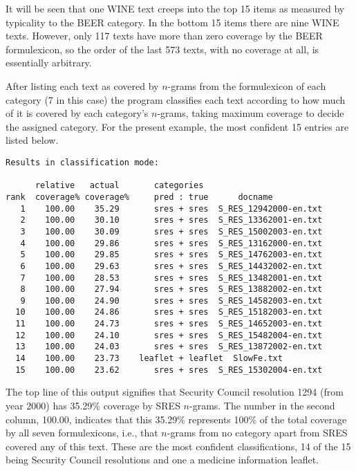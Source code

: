 \documentclass[output=paper]{langscibook}
\begin{document}
It will be seen that one WINE text creeps into the top 15 items as measured by typicality to the BEER category. In the bottom 15 items there are nine WINE texts. However, only 117 texts have more than zero coverage by the BEER formulexicon, so the order of the last 573 texts, with no coverage at all, is essentially arbitrary.

After listing each text as covered by $n$-grams from the formulexicon of each category (7 in this case) the program classifies each text according to how much of it is covered by each category's $n$-grams, taking maximum coverage to decide the assigned category. For the present example, the most confident 15 entries are listed below.\bigskip

\begin{lstlisting}[basicstyle=\small\ttfamily]
Results in classification mode:

      relative   actual       categories
rank  coverage% coverage%     pred : true      docname
   1    100.00    35.29       sres + sres  S_RES_12942000-en.txt
   2    100.00    30.10       sres + sres  S_RES_13362001-en.txt
   3    100.00    30.09       sres + sres  S_RES_15002003-en.txt
   4    100.00    29.86       sres + sres  S_RES_13162000-en.txt
   5    100.00    29.85       sres + sres  S_RES_14762003-en.txt
   6    100.00    29.63       sres + sres  S_RES_14432002-en.txt
   7    100.00    28.53       sres + sres  S_RES_13482001-en.txt
   8    100.00    27.94       sres + sres  S_RES_13882002-en.txt
   9    100.00    24.90       sres + sres  S_RES_14582003-en.txt
  10    100.00    24.86       sres + sres  S_RES_15182003-en.txt
  11    100.00    24.73       sres + sres  S_RES_14652003-en.txt
  12    100.00    24.10       sres + sres  S_RES_15482004-en.txt
  13    100.00    24.03       sres + sres  S_RES_13872002-en.txt
  14    100.00    23.73    leaflet + leaflet  SlowFe.txt
  15    100.00    23.62       sres + sres  S_RES_15302004-en.txt

\end{lstlisting}

The top line of this output signifies that Security Council resolution 1294 (from year 2000) has 35.29\% coverage by SRES $n$-grams. The number in the second column, 100.00, indicates that this 35.29\% represents 100\% of the total coverage by all seven formulexicons, i.e., that $n$-grams from no category apart from SRES covered any of this text. These are the most confident classifications, 14 of the 15 being Security Council resolutions and one a medicine information leaflet.
\end{document}
